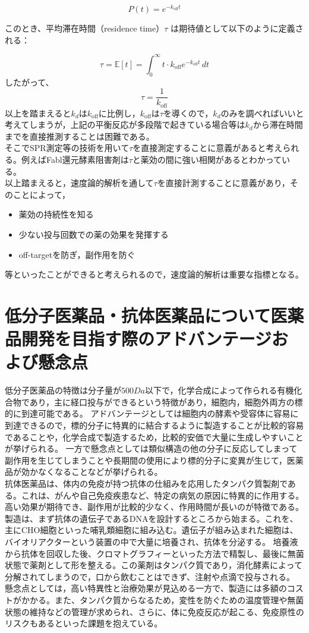 \documentclass[dvipdfmx, openany,10pt]{jsarticle}
\begin{document}
\[
P(t) = e^{-k_{\text{off}} t}
\]

このとき、平均滞在時間（residence time）$\tau$ は期待値として以下のように定義される：

\[
\tau = \mathbb{E}[t] = \int_0^\infty t \cdot k_{\text{off}} e^{-k_{\text{off}} t} \, dt
\]
したがって、
\[
\tau = \frac{1}{k_{\text{off}}}
\]
\indent 以上を踏まえると$k_d$は$k_{\text{off}}$に比例し，$k_{\text{off}}$は$\tau$を導くので，$k_d$のみを調べればいいと考えてしまうが，上記の平衡反応が多段階で起きている場合等は$k_d$から滞在時間までを直接推測することは困難である。\\
そこでSPR測定等の技術を用いて$\tau$を直接測定することに意義があると考えられる。例えばFabl還元酵素阻害剤は$\tau$と薬効の間に強い相関があるとわかっている。\\
以上踏まえると，速度論的解析を通して$\tau$を直接計測することに意義があり，そのことによって，
\begin{itemize}
  \item 薬効の持続性を知る
  \item 少ない投与回数での薬の効果を発揮する
  \item off-targetを防ぎ，副作用を防ぐ
\end{itemize}
等といったことができると考えられるので，速度論的解析は重要な指標となる。
{\small\section{低分子医薬品・抗体医薬品について医薬品開発を目指す際のアドバンテージおよび懸念点}}
低分子医薬品の特徴は分子量が$500Da$以下で，化学合成によって作られる有機化合物であり，主に経口投与ができるという特徴があり，細胞内，細胞外両方の標的に到達可能である。
アドバンテージとしては細胞内の酵素や受容体に容易に到達できるので，標的分子に特異的に結合するように製造することが比較的容易であることや，化学合成で製造するため，比較的安価で大量に生成しやすいことが挙げられる。
一方で懸念点としては類似構造の他の分子に反応してしまって副作用を生じてしまうことや長期間の使用により標的分子に変異が生じて，医薬品が効かなくなることなどが挙げられる。\\
\indent 抗体医薬品は、体内の免疫が持つ抗体の仕組みを応用したタンパク質製剤である。これは、がんや自己免疫疾患など、特定の病気の原因に特異的に作用する。高い効果が期待でき、副作用が比較的少なく、作用時間が長いのが特徴である。
製造は、まず抗体の遺伝子であるDNAを設計するところから始まる。これを、主にCHO細胞といった哺乳類細胞に組み込む。遺伝子が組み込まれた細胞は、バイオリアクターという装置の中で大量に培養され、抗体を分泌する。
培養液から抗体を回収した後、クロマトグラフィーといった方法で精製し、最後に無菌状態で薬剤として形を整える。この薬剤はタンパク質であり，消化酵素によって分解されてしまうので，口から飲むことはできず、注射や点滴で投与される。\\
\indent 懸念点としては，高い特異性と治療効果が見込める一方で、製造には多額のコストがかかる。また、タンパク質からなるため，変性を防ぐための温度管理や無菌状態の維持などの管理が求められ、さらに、体に免疫反応が起こる、免疫原性のリスクもあるといった課題を抱えている。
\end{document}
